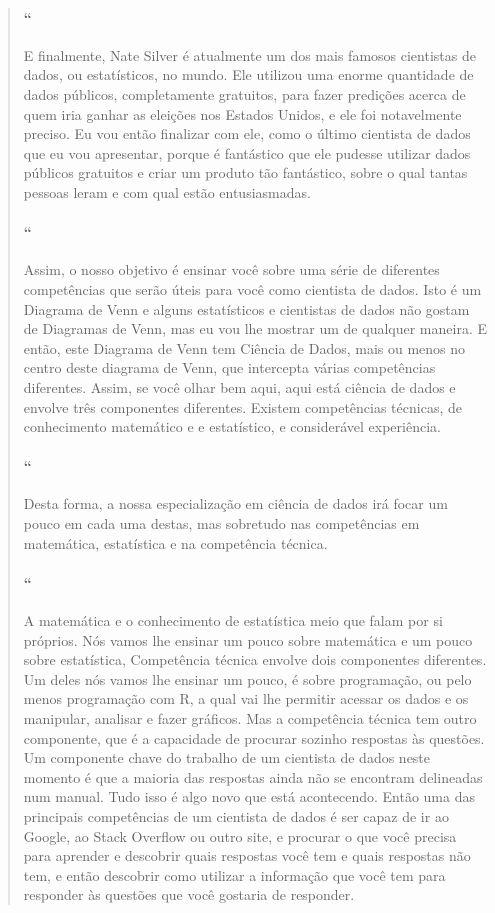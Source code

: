 \begin{quotation}
\begin{small}
\paragraph{``}
E finalmente, Nate Silver é atualmente um dos mais famosos cientistas de dados, ou estatísticos, no mundo.  Ele utilizou uma enorme quantidade de dados públicos, completamente gratuitos, para fazer predições acerca de quem iria ganhar as eleições nos Estados Unidos, e ele foi notavelmente preciso. Eu vou então finalizar com ele,  como o último cientista de dados que eu vou apresentar, porque é fantástico  que ele pudesse utilizar dados públicos gratuitos e criar um produto tão fantástico, sobre o qual tantas pessoas leram e com qual estão entusiasmadas. 

\paragraph{``}
Assim, o nosso objetivo é ensinar você sobre uma série de diferentes competências que serão úteis para você como cientista de dados. Isto é um Diagrama de Venn e alguns estatísticos e cientistas de dados não gostam de Diagramas de Venn, mas eu vou lhe mostrar um de qualquer maneira. E então, este Diagrama de Venn tem Ciência de Dados, mais ou menos no centro deste diagrama de Venn, que intercepta várias competências diferentes. Assim, se você olhar bem aqui,  aqui está ciência de dados e envolve três componentes diferentes. Existem competências técnicas, de conhecimento matemático e e estatístico, e considerável experiência.

\paragraph{``}
Desta forma, a nossa especialização em ciência de dados irá focar um pouco em cada uma destas, mas sobretudo nas competências  em matemática, estatística e na competência técnica.

\paragraph{``}
A matemática e o conhecimento de estatística meio que falam por si próprios. Nós vamos lhe ensinar um pouco sobre matemática e um pouco sobre estatística, Competência técnica envolve dois componentes diferentes. Um deles nós vamos lhe ensinar um pouco, é sobre programação, ou pelo menos programação com R, a qual vai lhe permitir acessar os dados e os manipular, analisar e fazer gráficos. Mas a competência técnica tem outro componente, que é a capacidade de procurar sozinho respostas às questões. Um componente chave do trabalho de um cientista de dados neste momento é que a maioria das respostas ainda não se encontram delineadas num manual. Tudo isso é algo novo que está acontecendo. Então uma das principais competências de um cientista de dados é ser capaz de ir ao Google, ao Stack Overflow ou outro site, e procurar o que você precisa para aprender e descobrir quais respostas você tem e quais respostas não tem, e então descobrir como utilizar a informação que você tem para responder às questões que você gostaria de responder.


\end{small}
\end{quotation}
